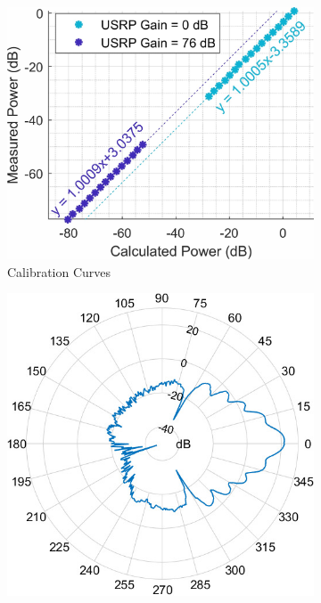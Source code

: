 \documentclass[10pt, twocolumn]{IEEEtran}
\begin{document}
\begin{figure} [t]
     \centering
     \begin{subfigure}{0.368\linewidth}
         \centering
         \includegraphics[width=1.0\linewidth]{figs/calibration.jpg}
         \caption{Calibration Curves}
     \end{subfigure}
     \begin{subfigure}{0.309\linewidth}
         \centering
         \includegraphics[width=1.0\linewidth]{figs/antenna_azimuth.jpg}

\end{subfigure}
\end{figure}
\end{document}
